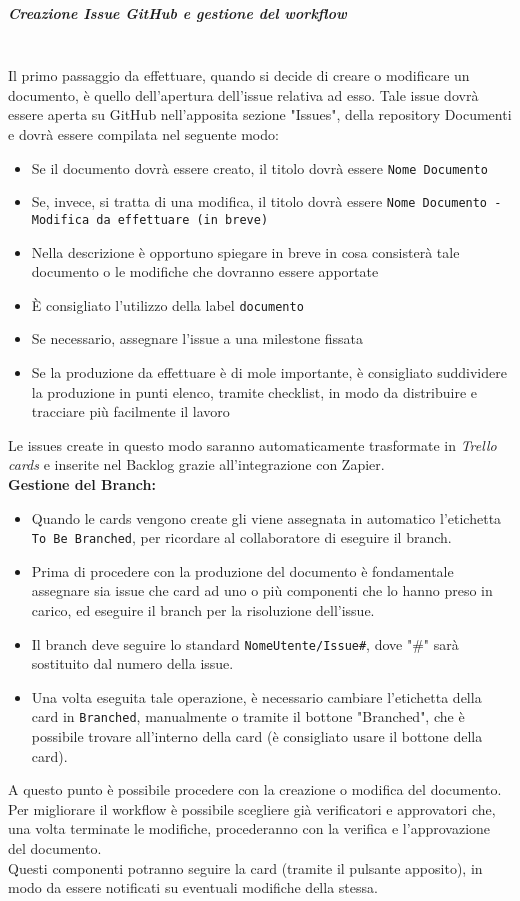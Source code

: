 \subparagraph{Creazione Issue GitHub e gestione del workflow}
\mbox{}\\
Il primo passaggio da effettuare, quando si decide di creare o modificare un documento, è quello dell'apertura dell'issue relativa ad esso.
Tale issue dovrà essere aperta su GitHub nell'apposita sezione "Issues", della repository Documenti e dovrà essere compilata nel seguente modo:
\begin{itemize}
    \item Se il documento dovrà essere creato, il titolo dovrà essere
    \texttt{Nome Documento}
    \item Se, invece, si tratta di una modifica, il titolo dovrà essere
    \texttt{Nome Documento - Modifica da effettuare (in breve)}
    \item Nella descrizione è opportuno spiegare in breve in cosa consisterà tale documento o le modifiche che dovranno essere apportate
    \item È consigliato l'utilizzo della label \texttt{documento}
    \item Se necessario, assegnare l'issue a una milestone fissata
    \item Se la produzione da effettuare è di mole importante, è consigliato suddividere la produzione in punti elenco, tramite checklist, in modo da distribuire e tracciare più facilmente il lavoro
\end{itemize}

\noindent Le issues create in questo modo saranno automaticamente trasformate in \textit{Trello cards} e inserite nel Backlog grazie all'integrazione con Zapier. \\

\noindent \textbf{Gestione del Branch:}
\begin{itemize}
    \item Quando le cards vengono create gli viene assegnata in automatico 
    l'etichetta \texttt{To Be Branched}, per ricordare al collaboratore di 
    eseguire il branch.
    \item Prima di procedere con la produzione del documento è fondamentale 
    assegnare sia issue che card ad uno o più componenti che lo hanno preso in carico, 
    ed eseguire il branch per la risoluzione dell'issue.
    \item Il branch deve seguire lo standard \texttt{NomeUtente/Issue\#}, 
    dove "\#" sarà sostituito dal numero della issue.
    \item Una volta eseguita tale operazione, è necessario cambiare l'etichetta 
    della card in \texttt{Branched}, manualmente o tramite il 
    bottone "Branched", che è possibile trovare all'interno della card (è consigliato usare il bottone della card).
\end{itemize}
\noindent A questo punto è possibile procedere con la creazione o modifica del documento.
Per migliorare il workflow è possibile scegliere già verificatori e 
approvatori che, una volta terminate le modifiche, procederanno con la 
verifica e l'approvazione del documento.\\ 
Questi componenti potranno seguire la card (tramite il pulsante apposito), 
in modo da essere notificati su eventuali modifiche della stessa.

